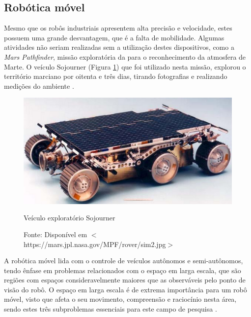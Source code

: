 \vspace{1cm}
\subsection{Robótica móvel}	


Mesmo que os robôs industriais apresentem alta precisão e velocidade, estes possuem uma grande desvantagem, que é a falta 
de mobilidade. %
Algumas atividades não seriam realizadas sem a utilização destes dispositivos, como a 
\textit{Mars Pathfinder}, missão exploratória da 
 para o reconhecimento da atmosfera de Marte. O 
veículo Sojourner (Figura \ref{fig:nasa}) que foi utilizado nesta missão, explorou o território marciano por oitenta e três dias, 
tirando fotografias e realizando 
medições do ambiente \cite{nasa}.

\begin{figure}[th]
 \centering
 \captionsetup{width=0.5\textwidth,font=footnotesize,textfont=bf}
 \includegraphics[scale=0.4]{figuras/nasa.png}
 \caption{Veículo exploratório Sojourner \label{fig:nasa}}
 \vspace{-0.3cm}
 \caption*{Fonte: Disponível em $<$https://mars.jpl.nasa.gov/MPF/rover/sim2.jpg$>$}
\end{figure}


A robótica móvel lida com o controle de veículos autônomos e semi-autônomos, tendo ênfase em problemas relacionados com o 
espaço em larga escala, que são regiões com espaços consideravelmente maiores que as observáveis pelo ponto de visão 
do robô. O espaço em larga escala é de extrema importância para um robô móvel, visto que afeta 
o seu movimento, compreensão e raciocínio nesta área, sendo estes três subproblemas essenciais para este campo de pesquisa
\cite{dudek_mobile}.

